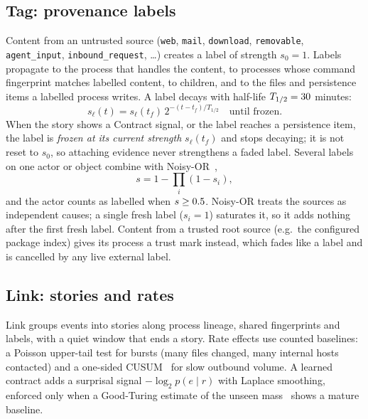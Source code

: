 \documentclass[10pt,twocolumn,letterpaper]{article}
\begin{document}
\subsection{Tag: provenance labels}
Content from an untrusted source (\texttt{web}, \texttt{mail}, \texttt{download},
\texttt{removable}, \texttt{agent\_input}, \texttt{inbound\_request}, \ldots) creates a label of
strength $s_0 = 1$. Labels propagate to the process that handles the content, to processes whose
command fingerprint matches labelled content, to children, and to the files and persistence items a
labelled process writes. A label decays with half-life $T_{1/2} = 30$ minutes:
\begin{equation}
  s_\ell(t) = s_\ell(t_f)\,2^{-(t - t_f)/T_{1/2}} \quad\text{until frozen.}
\end{equation}
When the story shows a Contract signal, or the label reaches a persistence item, the label is
\emph{frozen at its current strength} $s_\ell(t_f)$ and stops decaying; it is not reset to $s_0$, so
attaching evidence never strengthens a faded label. Several labels on one actor or object combine
with Noisy-OR~\cite{pearl1988probabilistic},
\begin{equation}
  s = 1 - \textstyle\prod_i (1 - s_i),
  \label{eq:noisyor}
\end{equation}
and the actor counts as labelled when $s \ge 0.5$. Noisy-OR treats the sources as
independent causes; a single fresh label ($s_i = 1$) saturates it, so it adds nothing after the
first fresh label. Content from a trusted root source (e.g.\ the configured package index) gives
its process a trust mark instead, which fades like a label and is cancelled by any live external
label.

\subsection{Link: stories and rates}
Link groups events into stories along process lineage, shared fingerprints and labels, with a
quiet window that ends a story. Rate effects use counted baselines: a Poisson upper-tail test for
bursts (many files changed, many internal hosts contacted) and a one-sided CUSUM~\cite{page1954continuous}
for slow outbound volume. A learned contract adds a surprisal signal $-\log_2 p(e\mid r)$ with
Laplace smoothing, enforced only when a Good-Turing estimate of the unseen mass~\cite{good1953population}
shows a mature baseline.
\end{document}
